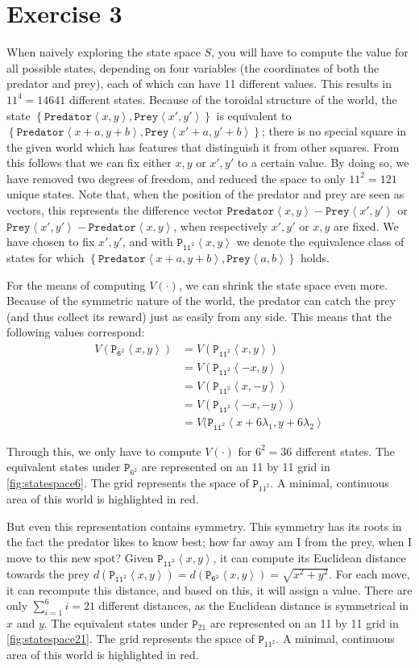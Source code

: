 \documentclass[a4paper,11pt]{article}
\newcommand{\Pred}[2]{\ensuremath{\mathtt{Predator}\left<#1, #2\right>}}
\newcommand{\Prey}[2]{\ensuremath{\mathtt{Prey}\left<#1, #2\right>}}
\newcommand{\p}[2]{\ensuremath{\mathtt{P_{11^2}}\left<#1, #2\right>}}
\newcommand{\pSW}[2]{\ensuremath{\mathtt{P_{6^2}}\left<#1, #2\right>}}
\begin{document}
\section*{Exercise 3}
When naively exploring the state space $S$, you will have to compute the value for all possible states, depending on four variables (the coordinates of both the predator and prey), each of which can have 11 different values.  This results in $11^4 = 14641$ different states.  Because of the toroidal structure of the world, the state $\left\{\Pred{x}{y}, \Prey{x'}{y'}\right\}$ is equivalent to $\left\{\Pred{x+a}{y+b}, \Prey{x'+a}{y'+b}\right\}$; there is no special square in the given world which has features that distinguish it from other squares.  From this follows that we can fix either $x, y$ or $x', y'$ to a certain value.  By doing so, we have removed two degrees of freedom, and reduced the space to only $11^2 = 121$ unique states.  Note that, when the position of the predator and prey are seen as vectors, this represents the difference vector $\Pred{x}{y} - \Prey{x'}{y'}$ or $\Prey{x'}{y'} - \Pred{x}{y}$, when respectively $x', y'$ or $x, y$ are fixed.  We have chosen to fix $x', y'$, and with $\p{x}{y}$ we denote the equivalence class of states for which $\left\{\Pred{x+a}{y+b}, \Prey{a}{b}\right\}$ holds.

For the means of computing $V(\cdot)$, we can shrink the state space even more.  Because of the symmetric nature of the world, the predator can catch the prey (and thus collect its reward) just as easily from any side.  This means that the following values correspond:
\begin{align*}
V(\pSW{x}{y})
  &= V(\p{x}{y}) \\
  &= V(\p{-x}{y}) \\
  &= V(\p{x}{-y}) \\
  &= V(\p{-x}{-y}) \\
  &= V(\p{x + 6 \lambda_1}{y + 6 \lambda_2}
\end{align*}

Through this, we only have to compute $V(\cdot)$ for $6^2 = 36$ different states.  The equivalent states under $\mathtt{P}_{6^2}$ are represented on an 11 by 11 grid in \autoref{fig:statespace6}.  The grid represents the space of $\mathtt{P}_{11^2}$.  A minimal, continuous area of this world is highlighted in red.

But even this representation contains symmetry.  This symmetry has its roots in the fact the predator likes to know best; how far away am I from the prey, when I move to this new spot?  Given $\p{x}{y}$, it can compute its Euclidean distance towards the prey $d(\p{x}{y}) = d(\pSW{x}{y}) = \sqrt{x^2+y^2}$.  For each move, it can recompute this distance, and based on this, it will assign a value.  There are only $\sum_{i=1}^{6} i = 21$ different distances, as the Euclidean distance is symmetrical in $x$ and $y$.  The equivalent states under $\mathtt{P}_{21}$ are represented on an 11 by 11 grid in \autoref{fig:statespace21}.  The grid represents the space of $\mathtt{P}_{11^2}$.  A minimal, continuous area of this world is highlighted in red.
\end{document}
